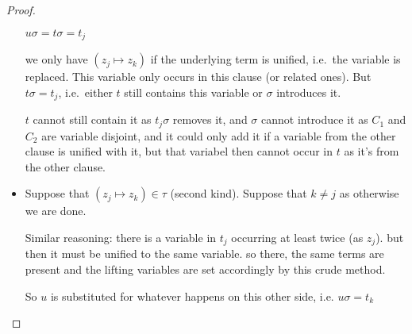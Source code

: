 \documentclass[,%
	paper=a4,%
	DIV14, 
	liststotoc,
	bibtotoc,
	draft=false,%
	numbers=noendperiod
]{scrartcl}
\begin{document}
\begin{proof}
\begin{itemize}
				\mytodo{}

				$u\sigma = t\sigma = t_j$

				we only have $(z_j \mapsto z_k)$ if the underlying term is unified, i.e.\ the variable is replaced.
				This variable only occurs in this clause (or related ones).
				But $t\sigma=t_j$, i.e.~either $t$ still contains this variable or $\sigma$ introduces it.

				$t$ cannot still contain it as $t_j\sigma$ removes it, and $\sigma$ cannot introduce it as $C_1$ and $C_2$ are variable disjoint, and it could only add it if a variable from the other clause is unified with it, but that variabel then cannot occur in $t$ as it's from the other clause.


			\item
				Suppose that $(z_j\mapsto z_k) \in \tau$ (second kind). Suppose that $k\neq j$ as otherwise we are done.

				Similar reasoning: there is a variable in $t_j$ occurring at least twice (as $z_j$).
				but then it must be unified to the same variable. so there, the same terms are present and the lifting variables are set accordingly by this crude method.

				So $u$ is substituted for whatever happens on this other side, i.e. $u\sigma = t_k$
	\end{itemize}
\end{proof}
\cbend
\end{document}
